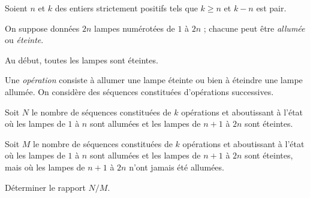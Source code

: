 Soient $n$ et $k$ des entiers strictement positifs tels que $k \geqslant n$ et $k - n$ est pair.

On suppose données $2n$ lampes numérotées de $1$ à $2n$ ; chacune peut être \emph{allumée} ou \emph{éteinte}.

Au début, toutes les lampes sont éteintes.

Une \emph{opération} consiste à allumer une lampe éteinte ou bien à éteindre une lampe allumée. On considère des
séquences constituées d'opérations successives.

Soit $N$ le nombre de séquences constituées de $k$ opérations et aboutissant à l'état où les lampes de $1$ à
$n$ sont allumées et les lampes de $n + 1$ à $2n$ sont éteintes.

Soit $M$ le nombre de séquences constituées de $k$ opérations et aboutissant à l'état où les lampes de $1$ à
$n$ sont allumées et les lampes de $n + 1$ à $2n$ sont éteintes, mais où les lampes de $n + 1$ à $2n$ n'ont
jamais été allumées.

Déterminer le rapport $N/M$.
